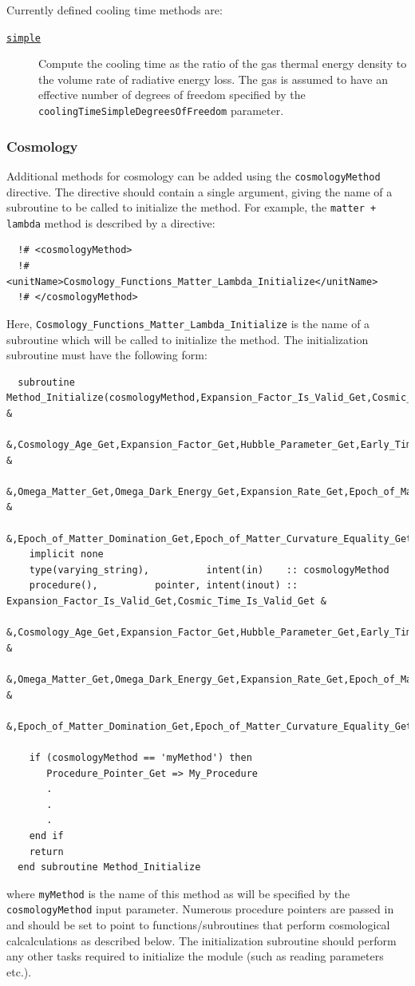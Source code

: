 Currently defined cooling time methods are:
\begin{description}
 \item [\hyperlink{cooling.cooling_time.simple.F90:cooling_times_simple:cooling_time_simple}{{\tt simple}}] Compute the cooling time as the ratio of the gas thermal energy density to the volume rate of radiative energy loss. The gas is assumed to have an effective number of degrees of freedom specified by the {\tt coolingTimeSimpleDegreesOfFreedom} parameter.
\end{description}

\subsubsection{Cosmology}\label{sec:CosmologyMethods}

Additional methods for cosmology can be added using the {\tt cosmologyMethod} directive. The directive should contain a single argument, giving the name of a subroutine to be called to initialize the method. For example, the {\tt matter + lambda} method is described by a directive:
\begin{verbatim}
  !# <cosmologyMethod>
  !#  <unitName>Cosmology_Functions_Matter_Lambda_Initialize</unitName>
  !# </cosmologyMethod>
\end{verbatim}
Here, {\tt Cosmology\_Functions\_Matter\_Lambda\_Initialize} is the name of a subroutine which will be called to initialize the method. The initialization subroutine must have the following form:
\begin{verbatim}
  subroutine Method_Initialize(cosmologyMethod,Expansion_Factor_Is_Valid_Get,Cosmic_Time_Is_Valid_Get &
       &,Cosmology_Age_Get,Expansion_Factor_Get,Hubble_Parameter_Get,Early_Time_Density_Scaling_Get  & 
       &,Omega_Matter_Get,Omega_Dark_Energy_Get,Expansion_Rate_Get,Epoch_of_Matter_Dark_Energy_Equality_Get &
       &,Epoch_of_Matter_Domination_Get,Epoch_of_Matter_Curvature_Equality_Get,CMB_Temperature_Get)
    implicit none
    type(varying_string),          intent(in)    :: cosmologyMethod
    procedure(),          pointer, intent(inout) :: Expansion_Factor_Is_Valid_Get,Cosmic_Time_Is_Valid_Get &
       &,Cosmology_Age_Get,Expansion_Factor_Get,Hubble_Parameter_Get,Early_Time_Density_Scaling_Get  & 
       &,Omega_Matter_Get,Omega_Dark_Energy_Get,Expansion_Rate_Get,Epoch_of_Matter_Dark_Energy_Equality_Get &
       &,Epoch_of_Matter_Domination_Get,Epoch_of_Matter_Curvature_Equality_Get,CMB_Temperature_Get
    
    if (cosmologyMethod == 'myMethod') then
       Procedure_Pointer_Get => My_Procedure
       .
       .
       .
    end if
    return
  end subroutine Method_Initialize
\end{verbatim}
where {\tt myMethod} is the name of this method as will be specified by the {\tt cosmologyMethod} input parameter. Numerous procedure pointers are passed in and should be set to point to functions/subroutines that perform cosmological calcalculations as described below. The initialization subroutine should perform any other tasks required to initialize the module (such as reading parameters etc.).

